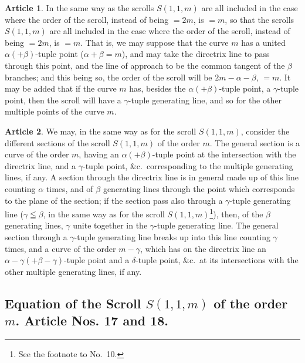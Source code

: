 \documentclass[12pt,a4paper]{article}
\theoremstyle{definition}
\newtheorem{art}{Article}[section]
\begin{document}
\begin{art}
In the same way as the scrolls $S(1, 1, m)$ are all included in the case where the order of the scroll, instead of being $= 2m$, is $= m$, so that the scrolls $S(1, 1, m)$ are all included in the case where the order of the scroll, instead of being $= 2m$, is $= m$. That is, we may suppose that the curve $m$ has a united $\alpha (+ \beta)$-tuple point ($\alpha + \beta = m$), and may take the directrix line to pass through this point, and the line of approach to be the common tangent of the $\beta$ branches; and this being so, the order of the scroll will be $2m - \alpha - \beta$, $= m$. It may be added that if the curve $m$ has, besides the $\alpha (+ \beta)$-tuple point, a $\gamma$-tuple point, then the scroll will have a $\gamma$-tuple generating line, and so for the other multiple points of the curve $m$.
\end{art}

\begin{art}
We may, in the same way as for the scroll $S(1, 1, m)$, consider the different sections of the scroll $S(1, 1, m)$ of the order $m$. The general section is a curve of the order $m$, having an $\alpha (+ \beta)$-tuple point at the intersection with the directrix line, and a $\gamma$-tuple point, \&c.\ corresponding to the multiple generating lines, if any. A section through the directrix line is in general made up of this line counting $\alpha$ times, and of $\beta$ generating lines through the point which corresponds to the plane of the section; if the section pass also through a $\gamma$-tuple generating line ($\gamma \leqq \beta$, in the same way as for the scroll $S(1, 1, m)$\footnote{See the footnote to No.~10.}), then, of the $\beta$ generating lines, $\gamma$ unite together in the $\gamma$-tuple generating line. The general section through a $\gamma$-tuple generating line breaks up into this line counting $\gamma$ times, and a curve of the order $m - \gamma$, which has on the directrix line an $\alpha - \gamma (+ \beta - \gamma)$-tuple point and a $\delta$-tuple point, \&c.\ at its intersections with the other multiple generating lines, if any.
\end{art}

\subsection*{Equation of the Scroll $S(1, 1, m)$ of the order $m$. Article Nos. 17 and 18.}
\end{document}
